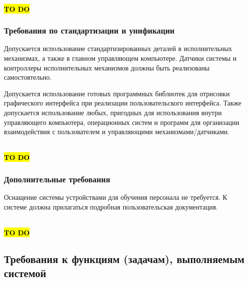\documentclass[a4paper, 12pt, titlepage]{article}
\begin{document}
\\
\hl{\bf TO DO}
\subsubsection{Требования по стандартизации и унификации}

Допускается использование стандартизированных деталей в исполнительных механизмах, а также в главном 
управляющем компьютере. Датчики системы и контроллеры исполнительных механизмов должны быть реализованы 
самостоятельно.

Допускается использование готовых программных библиотек для отрисовки графического интерфейса при реализации 
пользовательского интерфейса. Также допускается использование любых, пригодных для использования внутри управляющего 
компьютера, операционных систем и программ для организации взаимодействия с пользователем и управляющими 
механизмами/датчиками.

\\
\hl{\bf TO DO}
\subsubsection{Дополнительные требования}

Оснащение системы устройствами для обучения персонала не требуется. К системе должна прилагаться подробная пользовательская 
документация.

\\
\hl{\bf TO DO}
\subsection{Требования к функциям (задачам), выполняемым системой}
\end{document}
